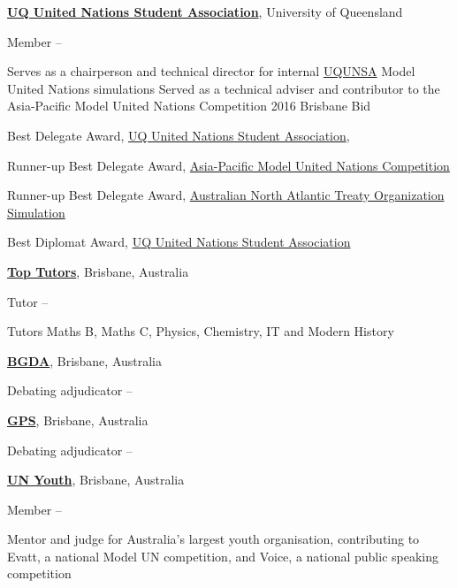 \documentclass[a4paper,10pt,oneside]{article}
\begin{document}
\begin{body}
\href{http://www.unsauq.org/}
{\textbf{UQ United Nations Student Association}},
University of Queensland

\par
Member
\hfill
{} --

\begin{detail}
\BulletItem
Serves as a chairperson and technical director for internal \href{http://www.unsauq.org/}{UQUNSA} Model United Nations simulations 
\BulletItem
Served as a technical adviser and contributor to the Asia-Pacific Model United Nations Competition 2016 Brisbane Bid
\end{detail}

\par
Best Delegate Award, \href{http://www.unsauq.org/}
{UQ United Nations Student Association},
\hfill
{}

\par
Runner-up Best Delegate Award, \href{http://www.amunc.net/}{Asia-Pacific Model United Nations Competition}
\hfill
{}

\par
Runner-up Best Delegate Award, \href{http://www.ausnatos.org/}{Australian North Atlantic Treaty Organization Simulation}
\hfill
{}

\par
Best Diplomat Award, \href{http://www.unsauq.org/}
{UQ United Nations Student Association}
\hfill
{}

\EntryGap
\href{https://www.toptutors.com.au/}
{\textbf{Top Tutors}},
Brisbane, Australia
\par
Tutor 
\hfill
{} --
\begin{detail}
Tutors Maths B, Maths C, Physics, Chemistry, IT and Modern History
\end{detail}

\EntryGap
\href{http://www.bgda.org.au/}
{\textbf{BGDA}},
Brisbane, Australia
\par
Debating adjudicator  
\hfill
{} --

\EntryGap
\href{http://www.gpsqld.org.au/}
{\textbf{GPS}},
Brisbane, Australia
\par
Debating adjudicator  
\hfill
{} --

\EntryGap
\href{https://unyouth.org.au/}
{\textbf{UN Youth}},
Brisbane, Australia

\par
Member
\hfill
{} --
\begin{detail}
\BulletItem
Mentor and judge for Australia's largest youth organisation, contributing to Evatt, a national Model UN competition, and Voice, a national public speaking competition
\end{detail}



\end{body}
\end{document}

